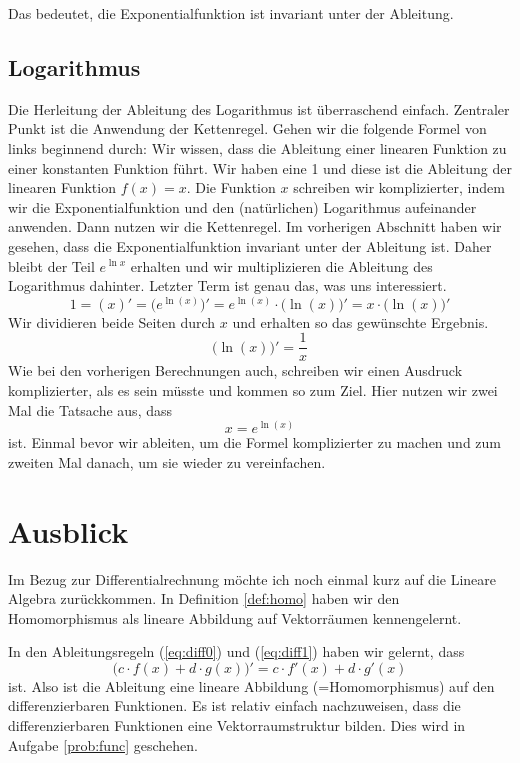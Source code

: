 Das bedeutet, die Exponentialfunktion ist invariant unter der Ableitung. 


\subsection{Logarithmus}
Die Herleitung der Ableitung des Logarithmus ist überraschend einfach. Zentraler Punkt ist die Anwendung der Kettenregel.  Gehen wir die folgende Formel von links beginnend durch: Wir wissen, dass die Ableitung einer linearen Funktion zu einer konstanten Funktion führt. Wir haben eine 1 und diese ist die Ableitung der linearen Funktion $f(x) = x$. Die Funktion $x$ schreiben wir komplizierter, indem wir die Exponentialfunktion und den (natürlichen) Logarithmus aufeinander anwenden. Dann nutzen wir die Kettenregel. Im vorherigen Abschnitt haben wir gesehen, dass die Exponentialfunktion invariant unter der Ableitung ist. Daher bleibt der Teil $e^{\ln x}$ erhalten und wir multiplizieren die Ableitung des Logarithmus dahinter. Letzter Term ist genau das, was uns interessiert. 
\begin{equation}
1 = (x)' = \big(e^{\ln(x)}\big)' = e^{\ln(x)}\cdot \big( \ln(x) \big)' = x \cdot \big( \ln(x) \big)'
\end{equation}
Wir dividieren beide Seiten durch $x$ und erhalten so das gewünschte Ergebnis.
\begin{equation}
\big( \ln(x) \big)' = \frac{1}{x}
\end{equation}
Wie bei den vorherigen Berechnungen auch, schreiben wir einen Ausdruck komplizierter, als es sein müsste und kommen so zum Ziel. Hier nutzen wir zwei Mal die Tatsache aus, dass
\begin{equation*}
x = e^{\ln(x)}
\end{equation*}
ist. Einmal bevor wir ableiten, um die Formel komplizierter zu machen und zum zweiten Mal danach, um sie wieder zu vereinfachen.

\section{Ausblick}

Im Bezug zur Differentialrechnung möchte ich noch einmal kurz auf die Lineare Algebra zurückkommen. In Definition \ref{def:homo} haben wir den Homomorphismus als lineare Abbildung auf Vektorräumen kennengelernt. 

In den Ableitungsregeln (\ref{eq:diff0}) und (\ref{eq:diff1}) haben wir gelernt, dass 
\begin{equation}
\big(c\cdot f(x) + d\cdot g(x)\big)' = c\cdot f'(x) + d\cdot g'(x)
\end{equation}
ist. Also ist die Ableitung eine lineare Abbildung (=Homomorphismus) auf den differenzierbaren Funktionen. Es ist relativ einfach nachzuweisen, dass die differenzierbaren Funktionen eine Vektorraumstruktur bilden. Dies wird in Aufgabe \ref{prob:func} geschehen.

